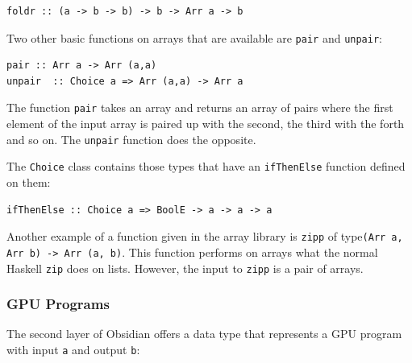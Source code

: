 \begin{small}
\begin{verbatim}
foldr :: (a -> b -> b) -> b -> Arr a -> b
\end{verbatim}
\end{small}
\noindent
Two other basic functions on arrays that are available are {\tt pair} and 
{\tt unpair}: 
\begin{small}
\begin{verbatim}
pair :: Arr a -> Arr (a,a)
unpair  :: Choice a => Arr (a,a) -> Arr a
\end{verbatim}
\end{small}
\noindent
The function {\tt pair} takes an array and returns an array of pairs where 
the first element of the input array is paired up with the second, the 
third with the forth and so on. The {\tt unpair} function does the 
opposite. %

The {\tt Choice} class contains those types that have an {\tt ifThenElse} 
function defined on them:  
\begin{small}
\begin{verbatim}
ifThenElse :: Choice a => BoolE -> a -> a -> a
\end{verbatim}
\end{small}
\noindent
Another example of a function given in the array library is {\tt zipp} of type{\tt (Arr a, Arr b) -> Arr (a, b)}.
This function performs on arrays what the normal Haskell {\tt zip} 
does on lists. However, the input to {\tt zipp} is a pair of arrays. 




\subsubsection{GPU Programs}
\label{sec:GPUPrograms}

The second layer of Obsidian offers a data type that represents a GPU program
with input {\tt a} and output {\tt b}:

